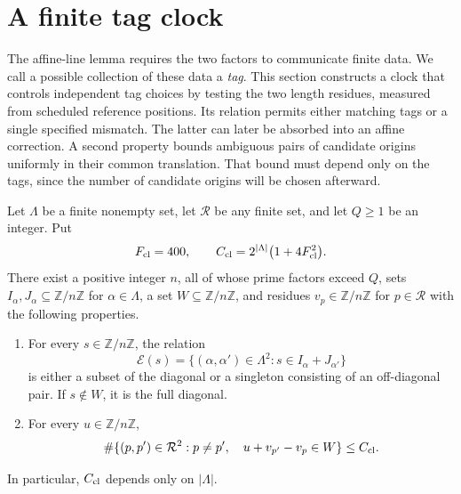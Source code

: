 \section{A finite tag clock}
\label{sec:clock}

The affine-line lemma requires the two factors to communicate finite data.
We call a possible collection of these data a \emph{tag}. This section
constructs a clock that controls independent tag choices by testing the
two length residues, measured from scheduled reference positions. Its relation permits either matching
tags or a single specified mismatch. The latter can later be absorbed into
an affine correction. A second property bounds ambiguous pairs of candidate
origins uniformly in their common translation. That bound must depend only
on the tags, since the number of candidate origins will be chosen afterward.

\begin{lemma}\label{lem:clock}
Let $\Lambda$ be a finite nonempty set, let $\mathcal R$ be any finite set,
and let $Q\geq 1$ be an integer.  Put
\[
 F_{\rm cl}=400,
 \qquad
 C_{\rm cl}=2^{|\Lambda|}\bigl(1+4F_{\rm cl}^{2}\bigr).
\]
There exist a positive integer $n$, all of whose prime factors exceed $Q$,
sets $I_\alpha,J_\alpha\subseteq\mathbb Z/n\mathbb Z$ for
$\alpha\in\Lambda$, a set $W\subseteq\mathbb Z/n\mathbb Z$, and residues
$v_p\in\mathbb Z/n\mathbb Z$ for $p\in\mathcal R$ with the following
properties.
\begin{enumerate}[label=\textup{(\roman*)}]
\item For every $s\in\mathbb Z/n\mathbb Z$, the relation
\[
 \mathcal E(s)=
 \{(\alpha,\alpha')\in\Lambda^2:
             s\in I_\alpha+J_{\alpha'}\}
\]
is either a subset of the diagonal or a singleton consisting of an
off-diagonal pair.  If $s\notin W$, it is the full diagonal.
\item For every $u\in\mathbb Z/n\mathbb Z$,
\[
 \#\{(p,p')\in\mathcal R^2:p\ne p',\quad
                 u+v_{p'}-v_p\in W\}\leq C_{\rm cl}.
\]
\end{enumerate}
In particular, $C_{\rm cl}$ depends only on $|\Lambda|$.
\end{lemma}

